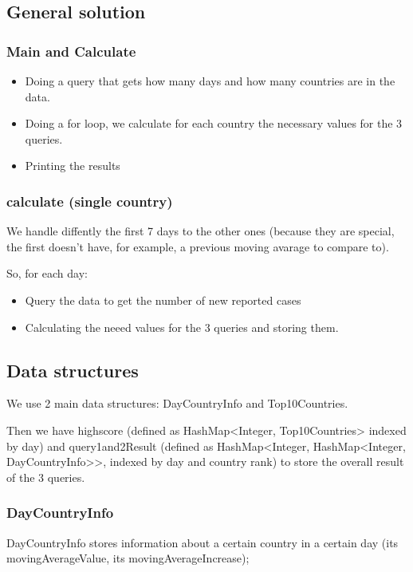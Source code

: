 \documentclass[table, 12pt]{article}
\begin{document}
\subsection{General solution}
\subsubsection{Main and Calculate}

\begin{itemize}
\setlength\itemsep{-0.5em}
\item Doing a query that gets how many days and how many countries are in the data.
\item Doing a for loop, we calculate for each country the necessary values for the 3 queries.
\item Printing the results
\end{itemize}

\subsubsection{calculate (single country)}

We handle diffently the first 7 days to the other ones (because they are special, the first doesn't have, for example, a previous moving avarage to compare to).

So, for each day:

\begin{itemize}
\setlength\itemsep{-0.5em}
\item Query the data to get the number of new reported cases
\item Calculating the neeed values for the 3 queries and storing them.
\end{itemize}

\subsection{Data structures}
We use 2 main data structures: DayCountryInfo and Top10Countries.

Then we have highscore (defined as HashMap<Integer, Top10Countries> indexed by day) and query1and2Result (defined as HashMap<Integer, HashMap<Integer, DayCountryInfo>>, indexed by day and country rank) to store the overall result of the 3 queries.

\subsubsection{DayCountryInfo}
DayCountryInfo stores information about a certain country in a certain day (its movingAverageValue, its movingAverageIncrease);
\end{document}
